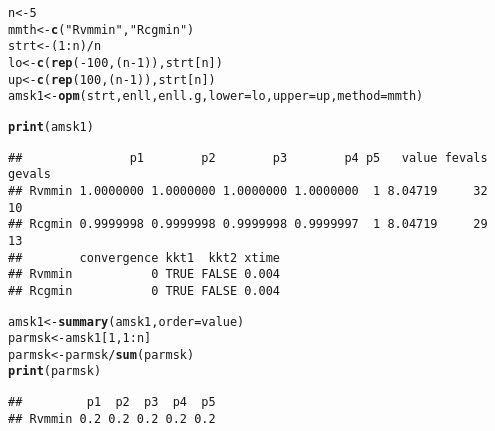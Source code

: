 \documentclass[11pt]{article}\usepackage[]{graphicx}\usepackage[]{color}
\makeatletter
\newcommand{\hlnum}[1]{\textcolor[rgb]{0.686,0.059,0.569}{#1}}%
\newcommand{\hlstr}[1]{\textcolor[rgb]{0.192,0.494,0.8}{#1}}%
\newcommand{\hlopt}[1]{\textcolor[rgb]{0,0,0}{#1}}%
\newcommand{\hlstd}[1]{\textcolor[rgb]{0.345,0.345,0.345}{#1}}%
\newcommand{\hlkwb}[1]{\textcolor[rgb]{0.69,0.353,0.396}{#1}}%
\newcommand{\hlkwc}[1]{\textcolor[rgb]{0.333,0.667,0.333}{#1}}%
\newcommand{\hlkwd}[1]{\textcolor[rgb]{0.737,0.353,0.396}{\textbf{#1}}}%
\newenvironment{kframe}{%
 \def\at@end@of@kframe{}%
 \ifinner\ifhmode%
  \def\at@end@of@kframe{\end{minipage}}%
  \begin{minipage}{\columnwidth}%
 \fi\fi%
 \def\FrameCommand##1{\hskip\@totalleftmargin \hskip-\fboxsep
 \colorbox{shadecolor}{##1}\hskip-\fboxsep
     \hskip-\linewidth \hskip-\@totalleftmargin \hskip\columnwidth}%
 \MakeFramed {\advance\hsize-\width
   \@totalleftmargin\z@ \linewidth\hsize
   \@setminipage}}%
 {\par\unskip\endMakeFramed%
 \at@end@of@kframe}
\newenvironment{knitrout}{}{} %
\makeatother
\begin{document}
\begin{knitrout}\scriptsize
{}\color{fgcolor}\begin{kframe}
\begin{alltt}
\hlstd{n}\hlkwb{<-}\hlnum{5}
\hlstd{mmth} \hlkwb{<-} \hlkwd{c}\hlstd{(}\hlstr{"Rvmmin"}\hlstd{,} \hlstr{"Rcgmin"}\hlstd{)}
\hlstd{strt} \hlkwb{<-} \hlstd{(}\hlnum{1}\hlopt{:}\hlstd{n)}\hlopt{/}\hlstd{n}
\hlstd{lo} \hlkwb{<-} \hlkwd{c}\hlstd{(}\hlkwd{rep}\hlstd{(}\hlopt{-}\hlnum{100}\hlstd{, (n}\hlopt{-}\hlnum{1}\hlstd{)),strt[n])}
\hlstd{up} \hlkwb{<-} \hlkwd{c}\hlstd{(}\hlkwd{rep}\hlstd{(}\hlnum{100}\hlstd{, (n}\hlopt{-}\hlnum{1}\hlstd{)),strt[n])}
\hlstd{amsk1} \hlkwb{<-} \hlkwd{opm}\hlstd{(strt, enll, enll.g,} \hlkwc{lower}\hlstd{=lo,} \hlkwc{upper}\hlstd{=up,} \hlkwc{method}\hlstd{=mmth)}
\end{alltt}


{\ttfamily\noindent\color{warningcolor}{\#\# Warning in bmchk(par, lower = lower, upper = upper): Masks (fixed parameters) set by bmchk due to tight bounds. CAUTION!!}}

{\ttfamily\noindent\color{warningcolor}{\#\# Warning in bmchk(par, lower = lower, upper = upper): Masks (fixed parameters) set by bmchk due to tight bounds. CAUTION!!}}

{\ttfamily\noindent\color{warningcolor}{\#\# Warning in bmchk(par, lower = lower, upper = upper): Masks (fixed parameters) set by bmchk due to tight bounds. CAUTION!!}}\begin{alltt}
\hlkwd{print}\hlstd{(amsk1)}
\end{alltt}
\begin{verbatim}
##               p1        p2        p3        p4 p5   value fevals gevals
## Rvmmin 1.0000000 1.0000000 1.0000000 1.0000000  1 8.04719     32     10
## Rcgmin 0.9999998 0.9999998 0.9999998 0.9999997  1 8.04719     29     13
##        convergence kkt1  kkt2 xtime
## Rvmmin           0 TRUE FALSE 0.004
## Rcgmin           0 TRUE FALSE 0.004
\end{verbatim}
\begin{alltt}
\hlstd{amsk1} \hlkwb{<-} \hlkwd{summary}\hlstd{(amsk1,} \hlkwc{order}\hlstd{=value)}
\hlstd{parmsk} \hlkwb{<-} \hlstd{amsk1[}\hlnum{1}\hlstd{,} \hlnum{1}\hlopt{:}\hlstd{n]}
\hlstd{parmsk} \hlkwb{<-} \hlstd{parmsk}\hlopt{/}\hlkwd{sum}\hlstd{(parmsk)}
\hlkwd{print}\hlstd{(parmsk)}
\end{alltt}
\begin{verbatim}
##         p1  p2  p3  p4  p5
## Rvmmin 0.2 0.2 0.2 0.2 0.2
\end{verbatim}
\end{kframe}
\end{knitrout}
\end{document}
